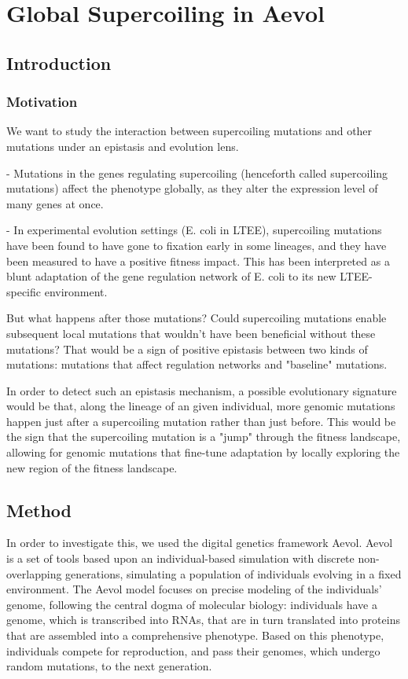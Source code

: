 \chapter{Global Supercoiling in Aevol}

\section{Introduction}

\subsection{Motivation}

We want to study the interaction between supercoiling mutations and other  mutations under an epistasis and evolution lens.

- Mutations in the genes regulating supercoiling (henceforth called supercoiling mutations) affect the phenotype globally, as they alter the expression level of many genes at once.

- In experimental evolution settings (E. coli in LTEE), supercoiling mutations have been found to have gone to fixation early in some lineages, and they have been measured to have a positive fitness impact.
This has been interpreted as a blunt adaptation of the gene regulation network of E. coli to its new LTEE-specific environment.

But what happens after those mutations?
Could supercoiling mutations enable subsequent local mutations that wouldn't have been beneficial without these mutations?
That would be a sign of positive epistasis between two kinds of mutations: mutations that affect regulation networks and "baseline" mutations.

In order to detect such an epistasis mechanism, a possible evolutionary signature would be that, along the lineage of an given individual, more genomic mutations happen just after a supercoiling mutation rather than just before.
This would be the sign that the supercoiling mutation is a "jump" through the fitness landscape, allowing for genomic mutations that fine-tune adaptation by locally exploring the new region of the fitness landscape.

\section{Method}

In order to investigate this, we used the digital genetics framework Aevol.
Aevol is a set of tools based upon an individual-based simulation with discrete non-overlapping generations, simulating a population of individuals evolving in a fixed environment.
The Aevol model focuses on precise modeling of the individuals' genome, following the central dogma of molecular biology: individuals have a genome, which is transcribed into RNAs, that are in turn translated into proteins that are assembled into a comprehensive phenotype.
Based on this phenotype, individuals compete for reproduction, and pass their genomes, which undergo random mutations, to the next generation.

